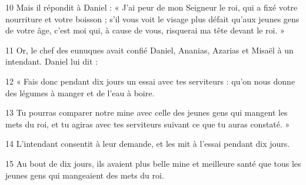 
10 Mais il répondit à Daniel : « J’ai peur de mon Seigneur le roi, qui a fixé votre nourriture et votre boisson ; s’il vous voit le visage plus défait qu’aux jeunes gens de votre âge, c’est moi qui, à cause de vous, risquerai ma tête devant le roi. »

11 Or, le chef des eunuques avait confié Daniel, Ananias, Azarias et Misaël à un intendant. Daniel lui dit :

12 « Fais donc pendant dix jours un essai avec tes serviteurs : qu’on nous donne des légumes à manger et de l’eau à boire.

13 Tu pourras comparer notre mine avec celle des jeunes gens qui mangent les mets du roi, et tu agiras avec tes serviteurs suivant ce que tu auras constaté. »

14 L’intendant consentit à leur demande, et les mit à l’essai pendant dix jours.

15 Au bout de dix jours, ils avaient plus belle mine et meilleure santé que tous les jeunes gens qui mangeaient des mets du roi.